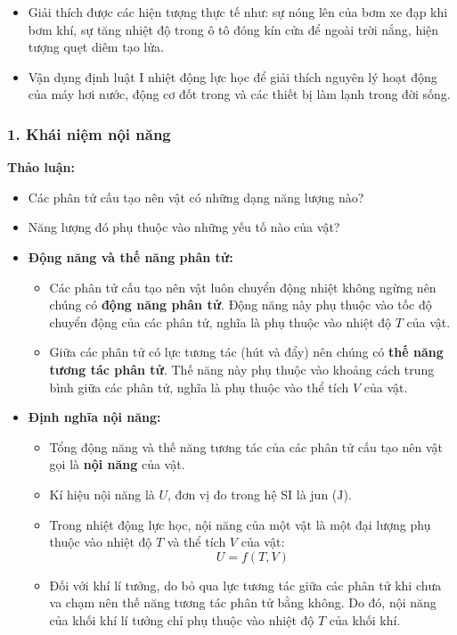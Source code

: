 \begin{emcothe}
\begin{itemize}
    \item Giải thích được các hiện tượng thực tế như: sự nóng lên của bơm xe đạp khi bơm khí, sự tăng nhiệt độ trong ô tô đóng kín cửa để ngoài trời nắng, hiện tượng quẹt diêm tạo lửa.
    \item Vận dụng định luật I nhiệt động lực học để giải thích nguyên lý hoạt động của máy hơi nước, động cơ đốt trong và các thiết bị làm lạnh trong đời sống.
\end{itemize}
\end{emcothe}
\subsubsection{1. Khái niệm nội năng}
\begin{hoatdong}
\textbf{Thảo luận:}
\begin{itemize}
    \item Các phân tử cấu tạo nên vật có những dạng năng lượng nào?
    \item Năng lượng đó phụ thuộc vào những yếu tố nào của vật?
\end{itemize}
\end{hoatdong}

\begin{itemize}
    \item \textbf{Động năng và thế năng phân tử:}
    \begin{itemize}
        \item Các phân tử cấu tạo nên vật luôn chuyển động nhiệt không ngừng nên chúng có \textbf{động năng phân tử}. Động năng này phụ thuộc vào tốc độ chuyển động của các phân tử, nghĩa là phụ thuộc vào nhiệt độ $T$ của vật.
        \item Giữa các phân tử có lực tương tác (hút và đẩy) nên chúng có \textbf{thế năng tương tác phân tử}. Thế năng này phụ thuộc vào khoảng cách trung bình giữa các phân tử, nghĩa là phụ thuộc vào thể tích $V$ của vật.
    \end{itemize}
    \item \textbf{Định nghĩa nội năng:}
    \begin{itemize}
        \item Tổng động năng và thế năng tương tác của các phân tử cấu tạo nên vật gọi là \textbf{nội năng} của vật.
        \item Kí hiệu nội năng là $U$, đơn vị đo trong hệ SI là jun ($\mathrm{J}$).
        \item Trong nhiệt động lực học, nội năng của một vật là một đại lượng phụ thuộc vào nhiệt độ $T$ và thể tích $V$ của vật:
        \[
        U = f(T, V)
        \]
        \item Đối với khí lí tưởng, do bỏ qua lực tương tác giữa các phân tử khi chưa va chạm nên thế năng tương tác phân tử bằng không. Do đó, nội năng của khối khí lí tưởng chỉ phụ thuộc vào nhiệt độ $T$ của khối khí.
    \end{itemize}
\end{itemize}

